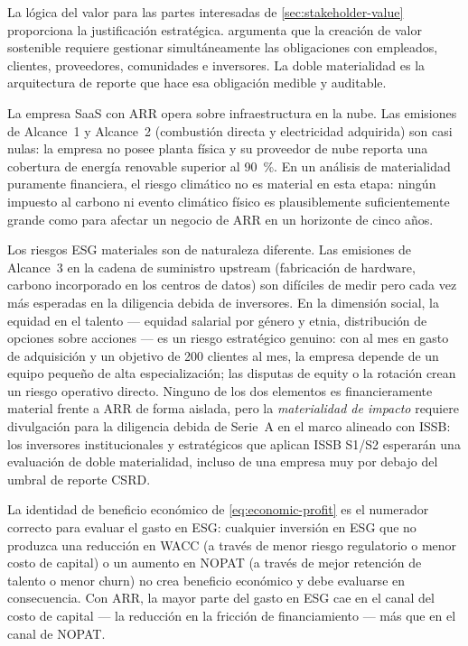 La lógica del valor para las partes interesadas de \cref{sec:stakeholder-value} proporciona la
justificación estratégica. \textcite{freeman2010strategic} argumenta que la creación de valor
sostenible requiere gestionar simultáneamente las obligaciones con empleados, clientes, proveedores,
comunidades e inversores. La doble materialidad es la arquitectura de reporte que hace esa
obligación medible y auditable.

\begin{example}
La empresa SaaS con  ARR opera sobre infraestructura en la nube. Las emisiones de
Alcance~1 y Alcance~2 (combustión directa y electricidad adquirida) son casi nulas: la empresa no
posee planta física y su proveedor de nube reporta una cobertura de energía renovable superior al
\qty{90}{\percent}. En un análisis de materialidad puramente financiera, el riesgo climático no es
material en esta etapa: ningún impuesto al carbono ni evento climático físico es plausiblemente
suficientemente grande como para afectar un negocio de  ARR en un horizonte de cinco
años.

Los riesgos ESG materiales son de naturaleza diferente. Las emisiones de Alcance~3 en la cadena de
suministro upstream (fabricación de hardware, carbono incorporado en los centros de datos) son
difíciles de medir pero cada vez más esperadas en la diligencia debida de inversores. En la
dimensión social, la equidad en el talento — equidad salarial por género y etnia, distribución de
opciones sobre acciones — es un riesgo estratégico genuino: con  al mes en gasto de
adquisición y un objetivo de 200 clientes al mes, la empresa depende de un equipo pequeño de alta
especialización; las disputas de equity o la rotación crean un riesgo operativo directo. Ninguno de
los dos elementos es financieramente material frente a  ARR de forma aislada, pero
la \emph{materialidad de impacto} requiere divulgación para la diligencia debida de Serie~A en el
marco alineado con ISSB: los inversores institucionales y estratégicos que aplican ISSB S1/S2
esperarán una evaluación de doble materialidad, incluso de una empresa muy por debajo del umbral de
reporte CSRD.

La identidad de beneficio económico de \cref{eq:economic-profit} es el numerador correcto para
evaluar el gasto en ESG: cualquier inversión en ESG que no produzca una reducción en WACC (a través
de menor riesgo regulatorio o menor costo de capital) o un aumento en NOPAT (a través de mejor
retención de talento o menor churn) no crea beneficio económico y debe evaluarse en consecuencia.
Con  ARR, la mayor parte del gasto en ESG cae en el canal del costo de capital —
la reducción en la fricción de financiamiento — más que en el canal de NOPAT.
\end{example}

